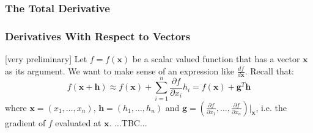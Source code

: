 


%



\subsubsection{The Total Derivative}






\subsubsection{Derivatives With Respect to Vectors}  [very preliminary]
Let $f = f(\mathbf{x})$ be a scalar valued function that has a vector $\mathbf{x}$ as its argument. We want to make sense of an expression like $\frac{d f}{d \mathbf{x}}$. Recall that:
\begin{equation}
f(\mathbf{x + h}) \approx 
f(\mathbf{x}) + \sum_{i=1}^{n} \frac{\partial f}{\partial x_i} h_i =
f(\mathbf{x}) + \mathbf{g}^T \mathbf{h}
\end{equation}
where $\mathbf{x} = (x_1,\ldots,x_n)$, $\mathbf{h} = (h_1,\ldots,h_n)$ and $\mathbf{g} = (\frac{\partial f}{\partial x_1},\ldots,\frac{\partial f}{\partial x_n})|_{\mathbf{x}}$, i.e. the gradient of $f$ evaluated at $\mathbf{x}$. ...TBC...


